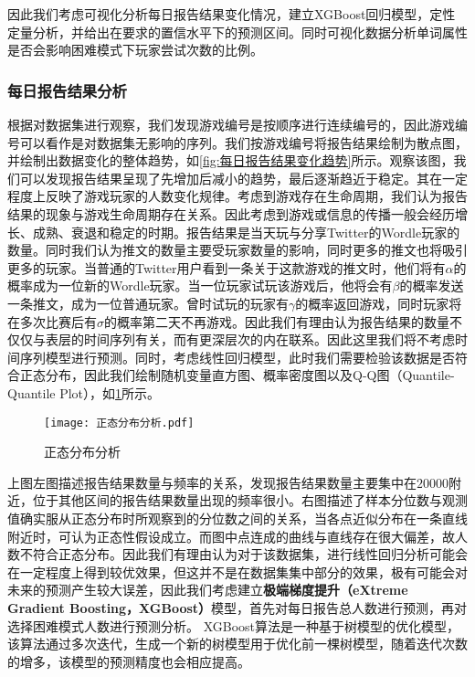 \documentclass{MathModeling}
\begin{document}
	因此我们考虑可视化分析每日报告结果变化情况，建立XGBoost回归模型，定性定量分析，并给出在要求的置信水平下的预测区间。同时可视化数据分析单词属性是否会影响困难模式下玩家尝试次数的比例。
	\subsubsection{每日报告结果分析}\label{XGBoost}
	根据对数据集进行观察，我们发现游戏编号是按顺序进行连续编号的，因此游戏编号可以看作是对数据集无影响的序列。我们按游戏编号将报告结果绘制为散点图，并绘制出数据变化的整体趋势，如\textcolor{blue}{\cref{fig:每日报告结果变化趋势}}所示。观察该图，我们可以发现报告结果呈现了先增加后减小的趋势，最后逐渐趋近于稳定。其在一定程度上反映了游戏玩家的人数变化规律。考虑到游戏存在生命周期，我们认为报告结果的现象与游戏生命周期存在关系。因此考虑到游戏或信息的传播一般会经历增长、成熟、衰退和稳定的时期。报告结果是当天玩与分享Twitter的Wordle玩家的数量。同时我们认为推文的数量主要受玩家数量的影响，同时更多的推文也将吸引更多的玩家。当普通的Twitter用户看到一条关于这款游戏的推文时，他们将有$\alpha$的概率成为一位新的Wordle玩家。当一位玩家试玩该游戏后，他将会有$\beta$的概率发送一条推文，成为一位普通玩家。曾时试玩的玩家有$\gamma$的概率返回游戏，同时玩家将在多次比赛后有$\sigma$的概率第二天不再游戏。因此我们有理由认为报告结果的数量不仅仅与表层的时间序列有关，而有更深层次的内在联系。因此这里我们将不考虑时间序列模型进行预测。同时，考虑线性回归模型，此时我们需要检验该数据是否符合正态分布，因此我们绘制随机变量直方图、概率密度图以及Q-Q图（Quantile-Quantile Plot），如\textcolor{blue}{\cref{fig:正态分布分析}}所示。
	\begin{figure}[H]
		\centering
		\texttt{[image: 正态分布分析.pdf]}
		\caption{正态分布分析}
		\label{fig:正态分布分析}
	\end{figure}
	
	上图左图描述报告结果数量与频率的关系，发现报告结果数量主要集中在$20000$附近，位于其他区间的报告结果数量出现的频率很小。右图描述了样本分位数与观测值确实服从正态分布时所观察到的分位数之间的关系，当各点近似分布在一条直线附近时，可认为正态性假设成立。而图中点连成的曲线与直线存在很大偏差，故人数不符合正态分布。因此我们有理由认为对于该数据集，进行线性回归分析可能会在一定程度上得到较优效果，但这并不是在数据集集中部分的效果，极有可能会对未来的预测产生较大误差，因此我们考虑建立\textbf{极端梯度提升（eXtreme Gradient Boosting，XGBoost）}模型，首先对每日报告总人数进行预测，再对选择困难模式人数进行预测分析。
	XGBoost算法是一种基于树模型的优化模型，该算法通过多次迭代，生成一个新的树模型用于优化前一棵树模型，随着迭代次数的增多，该模型的预测精度也会相应提高\textcolor{blue}{\cite{pxgboost1}}。
\end{document}
